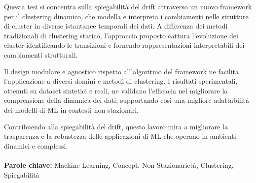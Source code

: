 Questa tesi si concentra sulla spiegabilità del drift attraverso un nuovo
framework per il clustering dinamico, che modella e interpreta i cambiamenti
nelle strutture di cluster in diverse istantanee temporali dei dati. A
differenza dei metodi tradizionali di clustering statico, l'approccio proposto
cattura l'evoluzione dei cluster identificando le transizioni e fornendo
rappresentazioni interpretabili dei cambiamenti strutturali.

Il design modulare e agnostico rispetto all'algoritmo del framework ne facilita
l'applicazione a diversi domini e metodi di clustering. I risultati
sperimentali, ottenuti su dataset sintetici e reali, ne validano l'efficacia
nel migliorare la comprensione della dinamica dei dati, supportando così una
migliore adattabilità dei modelli di ML in contesti non stazionari.

Contribuendo alla spiegabilità del drift, questo lavoro mira a migliorare la
trasparenza e la robustezza delle applicazioni di ML che operano in ambienti
dinamici e complessi. \\ \\ \textbf{Parole chiave:} Machine Learning, Concept,
Non Stazionarietà, Clustering, Spiegabilità %
